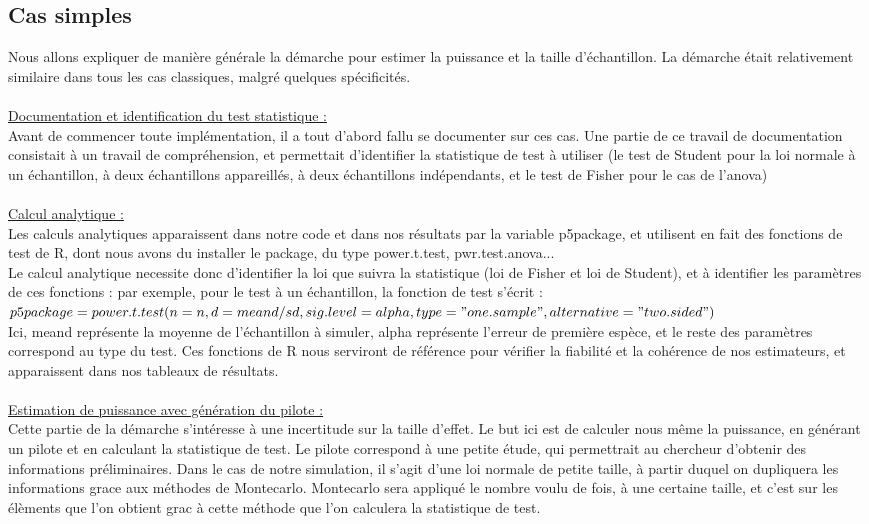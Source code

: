 \documentclass[a4paper,11pt]{article}
\begin{document}
\subsection{Cas simples}
Nous allons expliquer de manière générale la démarche pour estimer la puissance et la taille d'échantillon. La démarche était relativement similaire dans tous les cas classiques, malgré quelques spécificités.\\ \\
\underline{Documentation et identification du test statistique :} \\
Avant de commencer toute implémentation, il a tout d'abord fallu se documenter sur ces cas. Une partie de ce travail de documentation consistait à un travail de compréhension, et permettait d'identifier la statistique de test à utiliser (le test de Student pour la loi normale à un échantillon, à deux échantillons appareillés, à deux échantillons indépendants, et le test de Fisher pour le cas de l'anova)\\ \\
\underline{Calcul analytique :}\\ 
Les calculs analytiques apparaissent dans notre code et dans nos résultats par la variable p5package, et utilisent en fait des fonctions de test de R, dont nous avons du installer le package, du type power.t.test, pwr.test.anova...\\
Le calcul analytique necessite donc d'identifier la loi que suivra la statistique (loi de Fisher et loi de Student), et à identifier les paramètres de ces fonctions : par exemple, pour le test à un échantillon, la fonction de test s'écrit : $p5package = power.t.test(n=n, d = meand/sd, sig.level = alpha, type = "one.sample", alternative = "two.sided")$\\
Ici, meand représente la moyenne de l'échantillon à simuler, alpha représente l'erreur de première espèce, et le reste des paramètres correspond au type du test. Ces fonctions de R nous serviront de référence pour vérifier la fiabilité et la cohérence de nos estimateurs, et apparaissent dans nos tableaux de résultats. 
\\ \\
\underline{Estimation de puissance avec génération du pilote :}\\
Cette partie de la démarche s'intéresse à une incertitude sur la taille d'effet.
Le but ici est de calculer nous même la puissance, en générant un pilote et en calculant la statistique de test. Le pilote correspond à une petite étude, qui permettrait au chercheur d'obtenir des informations préliminaires. Dans le cas de notre simulation, il s'agit d'une loi normale de petite taille, à partir duquel on dupliquera les informations grace aux méthodes de Montecarlo. Montecarlo sera appliqué le nombre voulu de fois, à une certaine taille, et c'est sur les élèments que l'on obtient grac à cette méthode que l'on calculera la statistique de test.
\end{document}
